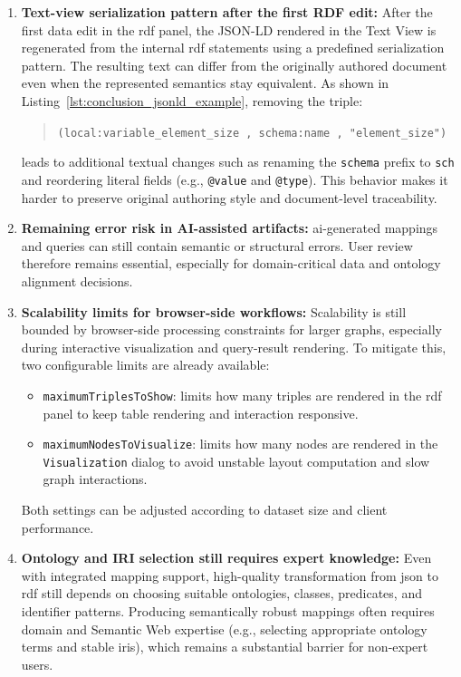 \begin{enumerate}
  \item \textbf{Text-view serialization pattern after the first RDF edit:} After the first data edit in the \gls{rdf} panel, the JSON-LD rendered in the Text View is regenerated from the internal \gls{rdf} statements using a predefined serialization pattern. The resulting text can differ from the originally authored document even when the represented semantics stay equivalent. As shown in Listing~\ref{lst:conclusion_jsonld_example}, removing the triple:
  
  \begin{quote}
  \small
  \texttt{(local:variable\_element\_size , \texttt{schema:name} , "element\_size")}
  \end{quote}
    
  leads to additional textual changes such as renaming the \texttt{schema} prefix to \texttt{sch} and reordering literal fields (e.g., \texttt{@value} and \texttt{@type}). This behavior makes it harder to preserve original authoring style and document-level traceability.

  \item \textbf{Remaining error risk in AI-assisted artifacts:} \gls{ai}-generated mappings and queries can still contain semantic or structural errors. User review therefore remains essential, especially for domain-critical data and ontology alignment decisions.

  \item \textbf{Scalability limits for browser-side workflows:} Scalability is still bounded by browser-side processing constraints for larger graphs, especially during interactive visualization and query-result rendering. To mitigate this, two configurable limits are already available:
  \begin{itemize}
    \item \texttt{maximumTriplesToShow}: limits how many triples are rendered in the \gls{rdf} panel to keep table rendering and interaction responsive.
    \item \texttt{maximumNodesToVisualize}: limits how many nodes are rendered in the \texttt{Visualization} dialog to avoid unstable layout computation and slow graph interactions.
  \end{itemize}
  Both settings can be adjusted according to dataset size and client performance.

  \item \textbf{Ontology and IRI selection still requires expert knowledge:} Even with integrated mapping support, high-quality transformation from \gls{json} to \gls{rdf} still depends on choosing suitable ontologies, classes, predicates, and identifier patterns. Producing semantically robust mappings often requires domain and Semantic Web expertise (e.g., selecting appropriate ontology terms and stable \glspl{iri}), which remains a substantial barrier for non-expert users.
\end{enumerate}

